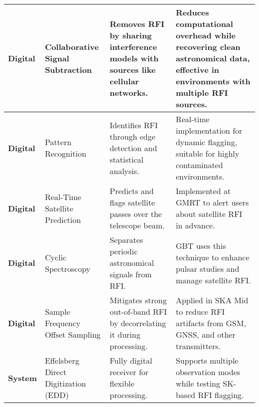 \begin{longtable}{|p{3cm}|p{4cm}|p{5cm}|p{5cm}|}
\hline
\textbf{Digital} & Collaborative Signal Subtraction & Removes RFI by sharing interference models with sources like cellular networks. & Reduces computational overhead while recovering clean astronomical data, effective in environments with multiple RFI sources. \\
\hline
\textbf{Digital} & Pattern Recognition & Identifies RFI through edge detection and statistical analysis. & Real-time implementation for dynamic flagging, suitable for highly contaminated environments. \\
\hline
\textbf{Digital} & Real-Time Satellite Prediction & Predicts and flags satellite passes over the telescope beam. & Implemented at GMRT to alert users about satellite RFI in advance. \\
\hline
\textbf{Digital} & Cyclic Spectroscopy & Separates periodic astronomical signals from RFI. & GBT uses this technique to enhance pulsar studies and manage satellite RFI. \\
\hline
\textbf{Digital} & Sample Frequency Offset Sampling & Mitigates strong out-of-band RFI by decorrelating it during processing. & Applied in SKA Mid to reduce RFI artifacts from GSM, GNSS, and other transmitters. \\
\hline
\textbf{System} & Effelsberg Direct Digitization (EDD) & Fully digital receiver for flexible processing. & Supports multiple observation modes while testing SK-based RFI flagging. \\
\hline
\end{longtable}







